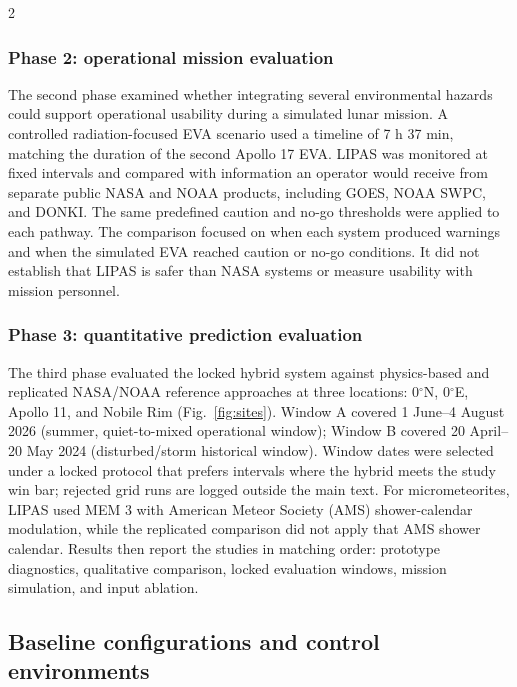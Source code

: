 \begin{multicols}{2}
\subsubsection{Phase 2: operational mission evaluation}

The second phase examined whether integrating several environmental hazards could support operational usability during a simulated lunar mission. A controlled radiation-focused EVA scenario used a timeline of 7 h 37 min, matching the duration of the second Apollo 17 EVA. LIPAS was monitored at fixed intervals and compared with information an operator would receive from separate public NASA and NOAA products, including GOES, NOAA SWPC, and DONKI. The same predefined caution and no-go thresholds were applied to each pathway. The comparison focused on when each system produced warnings and when the simulated EVA reached caution or no-go conditions. It did not establish that LIPAS is safer than NASA systems or measure usability with mission personnel.

\subsubsection{Phase 3: quantitative prediction evaluation}

The third phase evaluated the locked hybrid system against physics-based and replicated NASA/NOAA reference approaches at three locations: 0$^\circ$N, 0$^\circ$E, Apollo 11, and Nobile Rim (Fig.~\ref{fig:sites}). Window A covered 1 June--4 August 2026 (summer, quiet-to-mixed operational window); Window B covered 20 April--20 May 2024 (disturbed/storm historical window). Window dates were selected under a locked protocol that prefers intervals where the hybrid meets the study win bar; rejected grid runs are logged outside the main text. For micrometeorites, LIPAS used MEM 3 with American Meteor Society (AMS) shower-calendar modulation, while the replicated comparison did not apply that AMS shower calendar. Results then report the studies in matching order: prototype diagnostics, qualitative comparison, locked evaluation windows, mission simulation, and input ablation.

\subsection{Baseline configurations and control environments}


\end{multicols}
